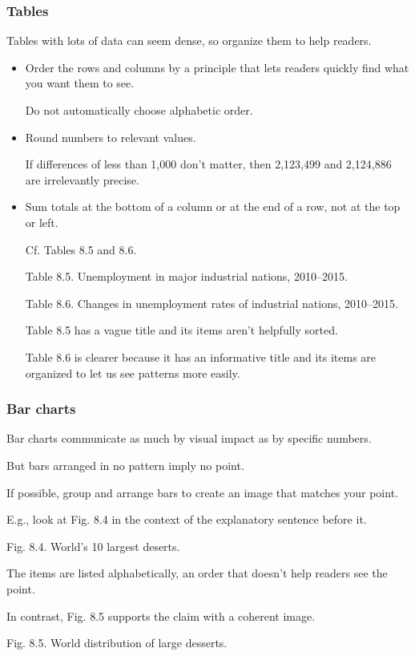 \documentclass[oneside]{book}
\numberwithin{equation}{section}
\begin{document}
\subsubsection{Tables}
Tables with lots of data can seem dense, so organize them to help readers.
\begin{itemize}
    \item Order the rows and columns by a principle that lets readers quickly find what you want them to see.
    
    Do not automatically choose alphabetic order.
    \item Round numbers to relevant values.
    
    If differences of less than 1,000 don't matter, then 2,123,499 and 2,124,886 are irrelevantly precise.
    \item Sum totals at the bottom of a column or at the end of a row, not at the top or left.
    
    Cf. Tables 8.5 and 8.6.
    
    \textsf{Table 8.5. Unemployment in major industrial nations, 2010--2015.}
    
    \textsf{Table 8.6. Changes in unemployment rates of industrial nations, 2010--2015.}
    
    Table 8.5 has a vague title and its items aren't helpfully sorted.
    
    Table 8.6 is clearer because it has an informative title and its items are organized to let us see patterns more easily.
\end{itemize}

\subsubsection{Bar charts}
Bar charts communicate as much by visual impact as by specific numbers.

But bars arranged in no pattern imply no point.

If possible, group and arrange bars to create an image that matches your point.

%
E.g., look at Fig. 8.4 in the context of the explanatory sentence before it.

\textsf{Fig. 8.4. World's 10 largest deserts.}

The items are listed alphabetically, an order that doesn't help readers see the point.

In contrast, Fig. 8.5 supports the claim with a coherent image.

\textsf{Fig. 8.5. World distribution of large desserts.}
\end{document}
